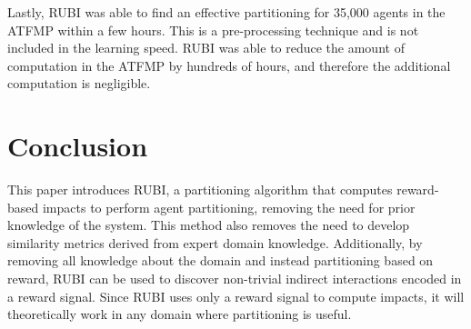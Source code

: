 \documentclass[letterpaper]{article}
\begin{document}
Lastly, RUBI was able to find an effective partitioning for 35,000 agents in the ATFMP within a few hours. This is a pre-processing technique and is not included in the learning speed. RUBI was able to reduce the amount of computation in the ATFMP by hundreds of hours, and therefore the additional computation is negligible. 


\section{Conclusion}
This paper introduces RUBI, a partitioning algorithm that computes reward-based impacts to perform agent partitioning, removing the need for prior knowledge of the system. This method also removes the need to develop similarity metrics derived from expert domain knowledge. Additionally, by removing all knowledge about the domain and instead partitioning based on reward, RUBI can be used to discover non-trivial indirect interactions encoded in a reward signal. Since RUBI uses only a reward signal to compute impacts, it will theoretically work in any domain where partitioning is useful.

\end{document}
